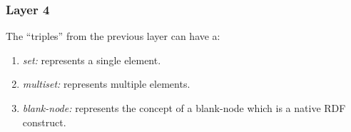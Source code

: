 \subsubsection{Layer 4}

The ``triples'' from the previous layer can have a:

\begin{enumerate}
\item \textit{set:} represents a single element.
\item \textit{multiset:} represents multiple elements.
\item \textit {blank-node:} represents the concept of a blank-node which is a native RDF construct.
\end{enumerate}

